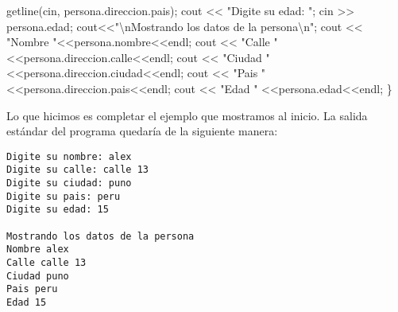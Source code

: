 \documentclass[
  11pt,
  a4paper,
  DIV=11,
  numbers=noendperiod]{scrreprt}
\newenvironment{Shaded}{\begin{snugshade}}{\end{snugshade}}
\newcommand{\NormalTok}[1]{\textcolor[rgb]{0.00,0.23,0.31}{#1}}
\newcommand{\OperatorTok}[1]{\textcolor[rgb]{0.37,0.37,0.37}{#1}}
\newcommand{\SpecialCharTok}[1]{\textcolor[rgb]{0.37,0.37,0.37}{#1}}
\newcommand{\StringTok}[1]{\textcolor[rgb]{0.13,0.47,0.30}{#1}}
\begin{document}
\begin{Shaded}
\begin{Highlighting}[]
\NormalTok{    getline}\OperatorTok{(}\NormalTok{cin}\OperatorTok{,}\NormalTok{ persona}\OperatorTok{.}\NormalTok{direccion}\OperatorTok{.}\NormalTok{pais}\OperatorTok{);}
\NormalTok{    cout }\OperatorTok{\textless{}\textless{}} \StringTok{"Digite su edad: "}\OperatorTok{;}
\NormalTok{    cin }\OperatorTok{\textgreater{}\textgreater{}}\NormalTok{ persona}\OperatorTok{.}\NormalTok{edad}\OperatorTok{;}
\NormalTok{    cout}\OperatorTok{\textless{}\textless{}}\StringTok{"}\SpecialCharTok{\textbackslash{}n}\StringTok{Mostrando los datos de la persona}\SpecialCharTok{\textbackslash{}n}\StringTok{"}\OperatorTok{;}
\NormalTok{    cout }\OperatorTok{\textless{}\textless{}} \StringTok{"Nombre "}\OperatorTok{\textless{}\textless{}}\NormalTok{persona}\OperatorTok{.}\NormalTok{nombre}\OperatorTok{\textless{}\textless{}}\NormalTok{endl}\OperatorTok{;}
\NormalTok{    cout }\OperatorTok{\textless{}\textless{}} \StringTok{"Calle "} \OperatorTok{\textless{}\textless{}}\NormalTok{persona}\OperatorTok{.}\NormalTok{direccion}\OperatorTok{.}\NormalTok{calle}\OperatorTok{\textless{}\textless{}}\NormalTok{endl}\OperatorTok{;}
\NormalTok{    cout }\OperatorTok{\textless{}\textless{}} \StringTok{"Ciudad "}\OperatorTok{\textless{}\textless{}}\NormalTok{persona}\OperatorTok{.}\NormalTok{direccion}\OperatorTok{.}\NormalTok{ciudad}\OperatorTok{\textless{}\textless{}}\NormalTok{endl}\OperatorTok{;}
\NormalTok{    cout }\OperatorTok{\textless{}\textless{}} \StringTok{"Pais "} \OperatorTok{\textless{}\textless{}}\NormalTok{persona}\OperatorTok{.}\NormalTok{direccion}\OperatorTok{.}\NormalTok{pais}\OperatorTok{\textless{}\textless{}}\NormalTok{endl}\OperatorTok{;}
\NormalTok{    cout }\OperatorTok{\textless{}\textless{}} \StringTok{"Edad "} \OperatorTok{\textless{}\textless{}}\NormalTok{persona}\OperatorTok{.}\NormalTok{edad}\OperatorTok{\textless{}\textless{}}\NormalTok{endl}\OperatorTok{;}
\OperatorTok{\}}
\end{Highlighting}
\end{Shaded}

Lo que hicimos es completar el ejemplo que mostramos al inicio. La
salida estándar del programa quedaría de la siguiente manera:

\begin{tcolorbox}[custombox]
\begin{verbatim}
Digite su nombre: alex
Digite su calle: calle 13
Digite su ciudad: puno
Digite su pais: peru
Digite su edad: 15

Mostrando los datos de la persona
Nombre alex
Calle calle 13
Ciudad puno
Pais peru
Edad 15
\end{verbatim}
\end{tcolorbox}
\end{document}
